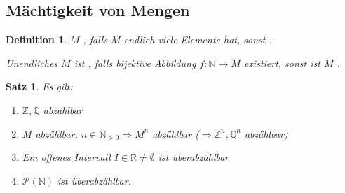 \documentclass[ngerman,a4paper]{report}
\theoremstyle{break}
\newtheorem{satz}[theorem]{Satz}
\newtheorem*{definition}{Definition}
\begin{document}
\subsection*{Mächtigkeit von Mengen}
\begin{definition}
	$M$ , falls $M$ endlich viele Elemente hat, sonst .
	
	Unendliches $M$ ist , falls bijektive Abbildung $f:\mathbb{N}\rightarrow M$ existiert, sonst ist $M$ .
\end{definition}
\begin{satz}
	Es gilt:
	\begin{enumerate}[label={\arabic*)}]
		\item $\mathbb{Z},\mathbb{Q}$ abzählbar
		\item $M$ abzählbar, $n\in\mathbb{N}_{>0} \Rightarrow M^n$ abzählbar ($\Rightarrow \mathbb{Z}^n, \mathbb{Q}^n$ abzählbar)
		\item Ein offenes Intervall $I\in\mathbb{R}\neq \emptyset $ ist überabzählbar
		\item $\mathcal{P}(\mathbb{N})$ ist überabzählbar.
	\end{enumerate}
\end{satz}
\end{document}
